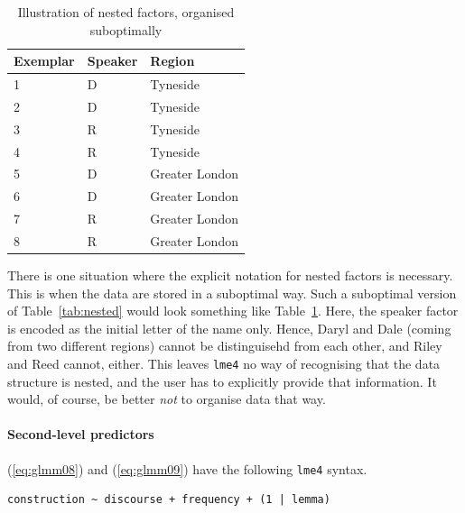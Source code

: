 \documentclass[a4paper,12pt]{article}
\begin{document}
\begin{table}
  \centering
  \begin{tabular}{lll}
    \toprule
    \textbf{Exemplar} & \textbf{Speaker}  & \textbf{Region}        \\
    \midrule
                    1 &           D      &         Tyneside       \\
                    2 &           D      &         Tyneside       \\
                    3 &           R      &         Tyneside       \\
                    4 &           R      &         Tyneside       \\
                    5 &           D      &         Greater London \\
                    6 &           D      &         Greater London \\
                    7 &           R      &         Greater London \\
                    8 &           R      &         Greater London \\
    \bottomrule
  \end{tabular}
  \caption{Illustration of nested factors, organised suboptimally}
  \label{tab:nestedwrong}
\end{table}

There is one situation where the explicit notation for nested factors is necessary.
This is when the data are stored in a suboptimal way.
Such a suboptimal version of Table~\ref{tab:nested} would look something like Table~\ref{tab:nestedwrong}.
Here, the speaker factor is encoded as the initial letter of the name only.
Hence, Daryl and Dale (coming from two different regions) cannot be distinguisehd from each other, and Riley and Reed cannot, either.
This leaves \texttt{lme4} no way of recognising that the data structure is nested, and the user has to explicitly provide that information.
It would, of course, be better \textit{not} to organise data that way.

\paragraph{Second-level predictors}

(\ref{eq:glmm08}) and (\ref{eq:glmm09}) have the following \texttt{lme4} syntax.

\vspace{0.5\baselineskip}

\begin{lstlisting}
construction ~ discourse + frequency + (1 | lemma)
\end{lstlisting}
\end{document}
